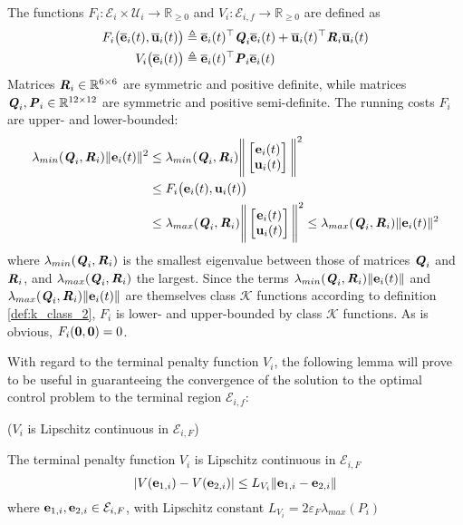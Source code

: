 The functions
$F_i : \mathcal{E}_i \times \mathcal{U}_i \to \mathbb{R}_{\geq 0}$ and
$V_i: \mathcal{E}_{i,f} \to \mathbb{R}_{\geq 0}$ are defined as
\begin{align}
  F_i \big(\overline{\bm{\mathbf{e}}}_i(t), \overline{\bm{\mathbf{u}}}_i(t)\big)
  &\triangleq \overline{\bm{\mathbf{e}}}_i(t)^{\top} \bm{\mathit{Q}}_i \overline{\bm{\mathbf{e}}}_i(t) + \overline{\bm{\mathbf{u}}}_i(t)^{\top} \bm{\mathit{R}}_i \overline{\bm{\mathbf{u}}}_i(t)\\
  V_i \big(\overline{\bm{\mathbf{e}}}_i(t)\big) & \triangleq \overline{\bm{\mathbf{e}}}_i(t)^{\top} \bm{\mathit{P}}_i \overline{\bm{\mathbf{e}}}_i(t)
\end{align}
Matrices $\bm{\mathit{R}}_i \in \mathbb{R}^{6 \times 6}$ are symmetric and positive
definite, while matrices $\bm{\mathit{Q}}_i, \bm{\mathit{P}}_i \in \mathbb{R}^{12 \times 12}$
are symmetric and positive semi-definite. The running costs $F_i$ are
upper- and lower-bounded:
\begin{align}
  \lambda_{min}(\bm{\mathit{Q}}_i, \bm{\mathit{R}}_i)\|\bm{\mathbf{e}}_i(t)\|^2 &\leq
  \lambda_{min}(\bm{\mathit{Q}}_i, \bm{\mathit{R}}_i) \Bigg\| \begin{bmatrix}
      \bm{\mathbf{e}}_i(t) \\
      \bm{\mathbf{u}}_i(t)
    \end{bmatrix}\Bigg\|^2  \\
    &\leq F_i \big(\bm{\mathbf{e}}_i(t), \bm{\mathbf{u}}_i(t)\big) \\
    &\leq \lambda_{max}(\bm{\mathit{Q}}_i, \bm{\mathit{R}}_i) \Bigg\| \begin{bmatrix}
      \bm{\mathbf{e}}_i(t) \\
      \bm{\mathbf{u}}_i(t)
    \end{bmatrix}\Bigg\|^2 \leq
  \lambda_{max}(\bm{\mathit{Q}}_i, \bm{\mathit{R}}_i) \|\bm{\mathbf{e}}_i(t)\|^2
\end{align}
where $\lambda_{min}(\bm{\mathit{Q}}_i, \bm{\mathit{R}}_i)$ is the smallest eigenvalue between
those of matrices $\bm{\mathit{Q}}_i$ and $\bm{\mathit{R}}_i$, and
$\lambda_{max}(\bm{\mathit{Q}}_i, \bm{\mathit{R}}_i)$ the largest. Since the terms
$\lambda_{min}(\bm{\mathit{Q}}_i, \bm{\mathit{R}}_i) \|\bm{\mathbf{e}}_i(t)\|$ and
$\lambda_{max}(\bm{\mathit{Q}}_i, \bm{\mathit{R}}_i) \|\bm{\mathbf{e}}_i(t)\|$ are themselves
class $\mathcal{K}$ functions according to definition \eqref{def:k_class_2},
$F_i$ is lower- and upper-bounded by class $\mathcal{K}$ functions. As is
obvious, $F_i(\bm{\mathbf{0}}, \bm{\mathbf{0}}) = 0$.


With regard to the terminal penalty function $V_i$, the following lemma will
prove to be useful in guaranteeing the convergence of the solution to the
optimal control problem to the terminal region $\mathcal{E}_{i,f}$:

\begin{bw_box}
\begin{lemma} ($V_i$ is Lipschitz continuous in $\mathcal{E}_{i,F}$)

  The terminal penalty function $V_i$ is Lipschitz continuous in
  $\mathcal{E}_{i,F}$
  $$|V(\bm{\mathbf{e}}_{1,i}) - V(\bm{\mathbf{e}}_{2,i})| \leq L_{V_i} \|\bm{\mathbf{e}}_{1,i} - \bm{\mathbf{e}}_{2,i}\|$$
  where $\bm{\mathbf{e}}_{1,i}, \bm{\mathbf{e}}_{2,i} \in \mathcal{E}_{i,F}$,
  with Lipschitz constant $L_{V_i} = 2 \varepsilon_F \lambda_{max}(P_i)$\\

\label{lemma:V_Lipschitz_e_0_2}
\end{lemma}
\end{bw_box}


